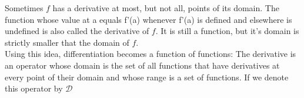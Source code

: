 \documentclass[../main.tex]{subfiles}
\begin{document}
Sometimes $f$ has a derivative at most, but not all, points of its domain.
The function whose value at a equals f'(a) whenever f'(a) is defined and elsewhere is undefined is also called the derivative of $f$. It is still a function, but it's domain is strictly smaller that the domain of $f$.\\

Using this idea, differentiation becomes a function of functions: The derivative is an operator whose domain is the set of all functions that have derivatives at every point of their domain and whose range is a set of functions. If we denote this operator by $\mathcal{D}$
\end{document}
